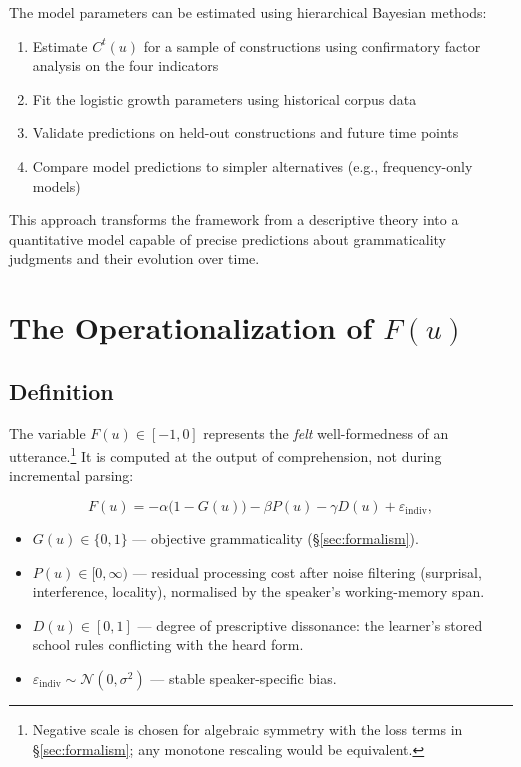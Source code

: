 \documentclass[12pt,letterpaper]{article}
\begin{document}
The model parameters can be estimated using hierarchical Bayesian methods:

\begin{enumerate}
    \item Estimate $C^t(u)$ for a sample of constructions using confirmatory factor analysis on the four indicators
    \item Fit the logistic growth parameters using historical corpus data
    \item Validate predictions on held-out constructions and future time points
    \item Compare model predictions to simpler alternatives (e.g., frequency-only models)
\end{enumerate}

This approach transforms the framework from a descriptive theory into a quantitative model capable of precise predictions about grammaticality judgments and their evolution over time.


\section{The Operationalization of \texorpdfstring{$F(u)$}{F(u)}}
\label{sec:Fu}

\subsection{Definition}
The variable $F(u)\in[-1,0]$ represents the \textit{felt} well-formedness of an
utterance.\footnote{Negative scale is chosen for algebraic symmetry with the
loss terms in §\ref{sec:formalism}; any monotone rescaling would be equivalent.}
It is computed at the output of comprehension, not during
incremental parsing:

\[
F(u)=
 -\alpha\bigl(1-G(u)\bigr)
 -\beta P(u)
 -\gamma D(u)
 +\varepsilon_{\!\text{indiv}} ,
\]

\begin{itemize}
  \item $G(u)\in\{0,1\}$ — objective grammaticality (§\ref{sec:formalism}).
  \item $P(u)\in[0,\infty)$ — residual processing cost after noise filtering
        (surprisal, interference, locality), normalised by the speaker’s
        working-memory span.
  \item $D(u)\in[0,1]$ — degree of prescriptive dissonance: the learner’s
        stored school rules conflicting with the heard form.
  \item $\varepsilon_{\!\text{indiv}}\sim\mathcal N(0,\sigma^2)$ — stable
        speaker-specific bias.
\end{itemize}
\end{document}
